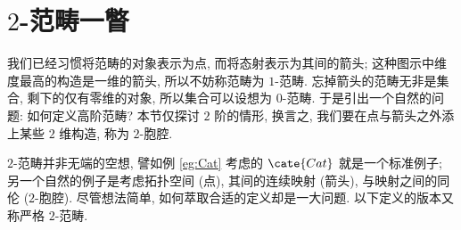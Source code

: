 \section{\texorpdfstring{$2$}{2}-范畴一瞥}\label{sec:2-cat}
我们已经习惯将范畴的对象表示为点, 而将态射表示为其间的箭头; 这种图示中维度最高的构造是一维的箭头, 所以不妨称范畴为 $1$-范畴. 忘掉箭头的范畴无非是集合, 剩下的仅有零维的对象, 所以集合可以设想为 $0$-范畴. 于是引出一个自然的问题: 如何定义高阶范畴? 本节仅探讨 $2$ 阶的情形, 换言之, 我们要在点与箭头之外添上某些 $2$ 维构造, 称为 $2$-胞腔.

$2$-范畴并非无端的空想, 譬如例 \ref{eg:Cat} 考虑的 $\cate{Cat}$ 就是一个标准例子; 另一个自然的例子是考虑拓扑空间 (点), 其间的连续映射 (箭头), 与映射之间的同伦 ($2$-胞腔). 尽管想法简单, 如何萃取合适的定义却是一大问题. 以下定义的版本又称严格 $2$-范畴.

